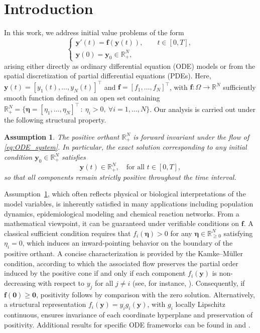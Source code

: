 \documentclass[a4paper,num-refs]{oup-contemporary-spidec}
\newtheorem{assumption}[theorem]{Assumption}
\begin{document}
\section{Introduction}
In this work, we address initial value problems of the form
\begin{equation}\label{eq:ODE_system}
\begin{cases}
    \bm{y}'(t) = \bm{f}(\bm{y}(t)), \qquad  t \in [0,T],\\
    \bm{y}(0) = \bm{y}_0 \in \mathbb{R}_{+}^{N},
\end{cases}
\end{equation}
arising either directly as ordinary differential equation (ODE) models or from the spatial discretization of partial differential equations (PDEs). Here, $\bm{y}(t) = [y_1(t),\dots,y_N(t)]^\top$ and
$\bm{f} = [f_1,\dots,f_N]^\top$, with $\bm{f} : \Omega \to \mathbb{R}^N$ sufficiently smooth function defined on an open set containing $\mathbb{R}_{+}^{N}=\{\bm{\eta}=[\eta_1,\dots,\eta_N]^\top \, : \ \eta_i>0, \ \forall i=1,\dots,N\}$. Our analysis is carried out under the following structural property.
\begin{assumption}\label{ass:Positivity}
    The positive orthant $\mathbb{R}_{+}^{N}$ is forward invariant under the flow of \eqref{eq:ODE_system}. In particular, the exact solution corresponding to any initial condition $\bm{y}_0 \in \mathbb{R}_{+}^{N}$ satisfies
    \begin{equation*}
        \bm{y}(t) \in \mathbb{R}_{+}^{N}, \quad \text{for all } t \in [0,T],
    \end{equation*}
    so that all components remain strictly positive throughout the time interval.
\end{assumption}
Assumption~\ref{ass:Positivity}, which often reflects physical or biological interpretations of the model variables, is inherently satisfied in many applications including population dynamics, epidemiological modeling and chemical reaction networks. From a mathematical viewpoint, it can be guaranteed under verifiable conditions on $\bm{f}$. A classical sufficient condition requires that $f_i(\bm{\eta})>0$ for any $\bm{\eta}\in\mathbb{R}^N_{\geq 0}$ satisfying $\eta_i=0$, which induces an inward-pointing behavior on the boundary of the positive orthant. A concise characterization is provided by the Kamke–M{\"u}ller condition, according to which the associated flow preserves the partial order induced by the positive cone if and only if each component $f_i(\bm y)$ is non-decreasing with respect to $y_j$ for all $j\neq i$ (see, for instance, \cite{Hanouzet_1996,Smith_order_preserving_survey}). Consequently, if $\bm f(\bm 0)\ge\bm0$, positivity follows by comparison with the zero solution. Alternatively, a structural representation $f_i(\bm{y}) = y_i g_i(\bm{y})$, with $g_i$ locally Lipschitz continuous, ensures invariance of each coordinate hyperplane and preservation of positivity. Additional results for specific ODE frameworks can be found in \cite[Theorem 3.3]{Formaggia_2011} and \cite[Theorem 1.2]{Torlo_Issues}.
\end{document}
